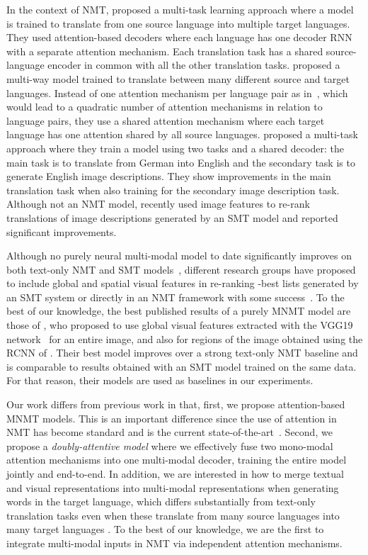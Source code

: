 \documentclass[11pt]{article}
\begin{document}
In the context of NMT,  proposed a multi-task learning approach where a model is trained to translate from one source language into multiple target languages.
They used attention-based decoders where each language has one decoder RNN with a separate attention mechanism.
Each translation task has a shared source-language encoder in common with all the other translation tasks.
 proposed a multi-way model trained to translate between many different source and target languages.
Instead of one attention mechanism per language pair as in~, which would lead to a quadratic number of attention mechanisms in relation to language pairs, they use a shared attention mechanism where each target language has one attention shared by all source languages.
 proposed a multi-task approach where they train a model using two tasks and a shared decoder: the main task is to translate from German into English and the secondary task is to generate English image descriptions.
They show improvements in the main translation task when also training for the secondary image description task.
Although not an NMT model,  recently used image features to re-rank translations of image descriptions generated by an SMT model and reported significant improvements.

Although no purely neural multi-modal model to date significantly improves on both text-only NMT and SMT models~\cite{Speciaetal2016}, different research groups have proposed to include global and spatial visual features in re-ranking -best lists generated by an SMT system or directly in an NMT framework with some success~\cite{Caglayanetal2016,CalixtoElliottFrank2016,Huangetal2016,Libovickyetal2016,Shahetal2016}.
To the best of our knowledge, the best published results of a purely MNMT model are those of , who proposed to use global visual features extracted with the VGG19 network~\cite{SimonyanZisserman2014} for an entire image, and also for regions of the image obtained using the RCNN of .
Their best model improves over a strong text-only NMT baseline and is comparable to results obtained with an SMT model trained on the same data.
For that reason, their models are used as baselines in our experiments.

Our work differs from previous work in that, first, we propose attention-based MNMT models.
This is an important difference since the use of attention in NMT has become standard and is the current state-of-the-art~\cite{Jeanetal2015,Luongetal2015,Firatetal2016,Sennrichetal2016}.
Second, we propose a \emph{doubly-attentive model} where we effectively fuse two mono-modal attention mechanisms into one multi-modal decoder, training the entire model jointly and end-to-end.
In addition, we are interested in how to merge textual and visual representations into multi-modal representations when generating words in the target language, which differs substantially from text-only translation tasks even when these translate from many source languages into many target languages \cite{Dongetal2015,Firatetal2016}.
To the best of our knowledge, we are the first to integrate multi-modal inputs in NMT via independent attention mechanisms.
\end{document}

